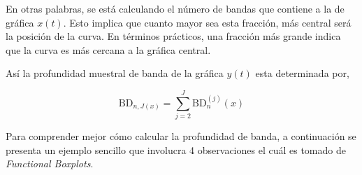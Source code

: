En otras palabras, se está calculando el número de bandas que contiene a la de gráfica $x(t)$. Esto implica que cuanto mayor sea esta fracción, más central será la posición de la curva. En términos prácticos, una fracción más grande indica que la curva es más cercana a la gráfica central.

Así la profundidad muestral de banda de la gráfica $y(t)$ esta determinada por, 

\begin{equation}
    \mathrm{BD}_{n, J(x)} = \sum_{j = 2}^{J} \mathrm{BD}_n^{(j)}(x)
\end{equation}

Para comprender mejor cómo calcular la profundidad de banda, a continuación se presenta un ejemplo sencillo que involucra 4 observaciones el cuál es tomado de \textit{Functional Boxplots}\cite{boxplotFun}.

